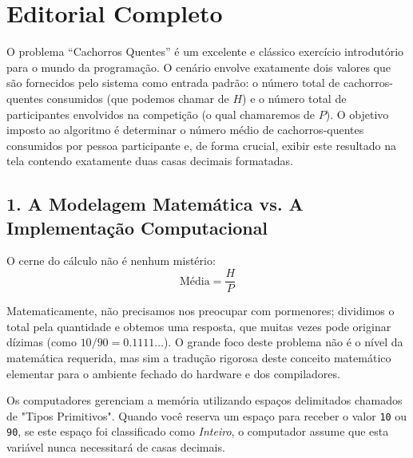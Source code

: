 \documentclass[11pt]{article}
\begin{document}

\newpage
\section*{Editorial Completo}

O problema ``Cachorros Quentes'' é um excelente e clássico exercício introdutório para o mundo da programação. O cenário envolve exatamente dois valores que são fornecidos pelo sistema como entrada padrão: o número total de cachorros-quentes consumidos (que podemos chamar de $H$) e o número total de participantes envolvidos na competição (o qual chamaremos de $P$). O objetivo imposto ao algoritmo é determinar o número médio de cachorros-quentes consumidos por pessoa participante e, de forma crucial, exibir este resultado na tela contendo exatamente duas casas decimais formatadas.

\subsection*{1. A Modelagem Matemática vs. A Implementação Computacional}

O cerne do cálculo não é nenhum mistério:
\begin{equation}
    \text{Média} = \frac{H}{P}
\end{equation}

Matematicamente, não precisamos nos preocupar com pormenores; dividimos o total pela quantidade e obtemos uma resposta, que muitas vezes pode originar dízimas (como $10 / 90 = 0.1111\dots$). O grande foco deste problema não é o nível da matemática requerida, mas sim a tradução rigorosa deste conceito matemático elementar para o ambiente fechado do hardware e dos compiladores. 

Os computadores gerenciam a memória utilizando espaços delimitados chamados de "Tipos Primitivos". Quando você reserva um espaço para receber o valor \texttt{10} ou \texttt{90}, se este espaço foi classificado como \textit{Inteiro}, o computador assume que esta variável nunca necessitará de casas decimais.
\end{document}
